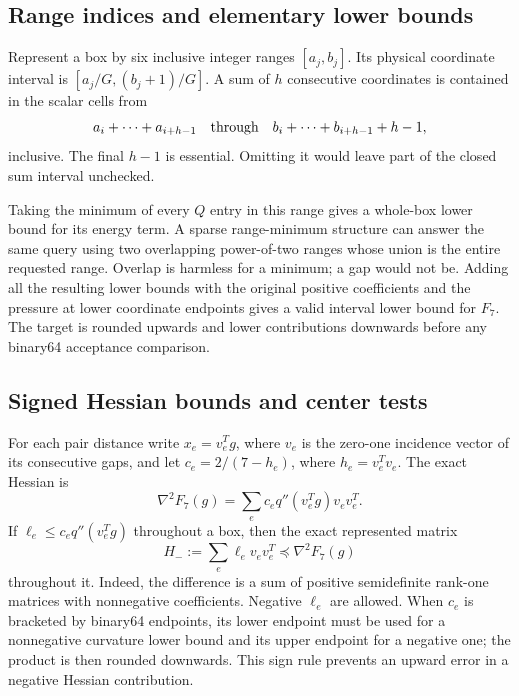 \documentclass[11pt]{amsart}
\numberwithin{equation}{section}
\begin{document}
\subsection{Range indices and elementary lower bounds}

Represent a box by six inclusive integer ranges $[a_j,b_j]$.
Its physical coordinate interval is
$[a_j/G,(b_j+1)/G]$. A sum of $h$ consecutive coordinates is
contained in the scalar cells from
\begin{equation}\label{eq:sumindices}
 a_i+\cdots+a_{i+h-1}
 \quad\hbox{through}\quad
 b_i+\cdots+b_{i+h-1}+h-1,
\end{equation}
inclusive. The final $h-1$ is essential. Omitting it would leave
part of the closed sum interval unchecked.

Taking the minimum of every $Q$ entry in this range gives a whole-box
lower bound for its energy term. A sparse range-minimum structure can
answer the same query using two overlapping power-of-two ranges whose
union is the entire requested range. Overlap is harmless for a
minimum; a gap would not be. Adding all the resulting lower bounds
with the original positive coefficients and the pressure at lower
coordinate endpoints gives a valid interval lower bound for $F_7$.
The target is rounded upwards and lower contributions downwards
before any binary64 acceptance comparison.

\subsection{Signed Hessian bounds and center tests}

For each pair distance write $x_e=v_e^Tg$, where $v_e$ is the zero-one
incidence vector of its consecutive gaps, and let $c_e=2/(7-h_e)$,
where $h_e=v_e^Tv_e$. The exact Hessian is
\begin{equation}\label{eq:hessian7}
 \nabla^2 F_7(g)=\sum_e c_e q''(v_e^Tg)v_ev_e^T.
\end{equation}
If $\ell_e\leq c_eq''(v_e^Tg)$ throughout a box, then the exact
represented matrix
\begin{equation}\label{eq:matrixlower}
 H_-:=\sum_e\ell_ev_ev_e^T\preceq\nabla^2F_7(g)
\end{equation}
throughout it. Indeed, the difference is a sum of positive
semidefinite rank-one matrices with nonnegative coefficients. Negative
$\ell_e$ are allowed. When $c_e$ is bracketed by binary64 endpoints,
its lower endpoint must be used for a nonnegative curvature lower
bound and its upper endpoint for a negative one; the product is then
rounded downwards. This sign rule prevents an upward error in a
negative Hessian contribution.
\end{document}
